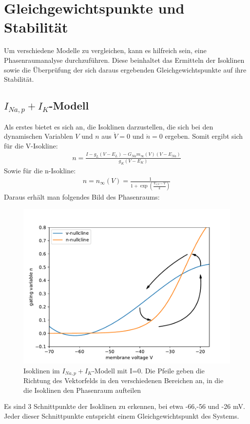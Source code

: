 \documentclass[12pt,a4paper]{article}
\begin{document}

\thispagestyle{empty}
\newpage
\tableofcontents
\thispagestyle{empty}
\newpage
{}

\section{Gleichgewichtspunkte und Stabilität}
Um verschiedene Modelle zu vergleichen, kann es hilfreich sein, eine Phasenraumanalyse durchzuführen. Diese beinhaltet das Ermitteln der Isoklinen sowie die Überprüfung der sich daraus ergebenden Gleichgewichtspunkte auf ihre Stabilität. 
\subsection{$I_{Na,p}+I_K$-Modell}
Als erstes bietet es sich an, die Isoklinen darzustellen, die sich bei den dynamischen Variablen $V$ und $n$ aus $\dot{V}=0$ und $\dot{n}=0$ ergeben. Somit ergibt sich für die V-Isokline:
\begin{align*} 
n=\frac{I-g_L(V-E_L)-G_{Na}m_{\infty}(V)(V-E_{Na})}{g_K(V-E_K)}
\end{align*}
Sowie für die n-Isokline:
\begin{align}
n=n_{\infty}(V)=\frac{1}{1+\exp\left(\frac{V_{1/2}-V}{k}\right)}
\end{align}
Daraus erhält man folgendes Bild des Phasenraums: 
\begin{figure}[H]
	\centering
	\includegraphics[scale=0.9]{inapiknc1.pdf} 
	\caption{Isoklinen im $I_{Na,p}+I_K$-Modell mit I=0. Die Pfeile geben die Richtung des Vektorfelds in den verschiedenen Bereichen an, in die die Isoklinen den Phasenraum aufteilen}
	\label{niso}
\end{figure} 
Es sind 3 Schnittpunkte der Isoklinen zu erkennen, bei etwa -66,-56 und -26 mV. Jeder dieser Schnittpunkte entspricht einem Gleichgewichtspunkt des Systems. 
\end{document}
